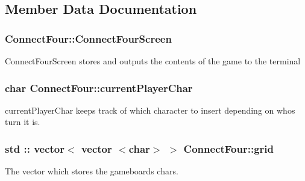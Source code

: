 \subsection{Member Data Documentation}
\hypertarget{classConnectFour_a7548207e4c83260233e8d3668ae3e7e2}{
\subsubsection[{Connect\-Four\-Screen}]{ Connect\-Four\-::\-Connect\-Four\-Screen\hspace{0.3cm}{\ttfamily [private]}}}\label{classConnectFour_a7548207e4c83260233e8d3668ae3e7e2}
Connect\-Four\-Screen stores and outputs the contents of the game to the terminal \hypertarget{classConnectFour_adc938d715dbe28efc1db3b4a1dc866cb}{
\subsubsection[{current\-Player\-Char}]{\setlength{\rightskip}{0pt plus 5cm}char Connect\-Four\-::current\-Player\-Char\hspace{0.3cm}{\ttfamily [private]}}}\label{classConnectFour_adc938d715dbe28efc1db3b4a1dc866cb}
current\-Player\-Char keeps track of which character to insert depending on whos turn it is. \hypertarget{classConnectFour_aa394189c6422c3901d18997202fff27e}{
\subsubsection[{grid}]{\setlength{\rightskip}{0pt plus 5cm}std \-:: vector$<$ vector $<$char$>$ $>$ Connect\-Four\-::grid\hspace{0.3cm}{\ttfamily [private]}}}\label{classConnectFour_aa394189c6422c3901d18997202fff27e}


The vector which stores the gameboards chars. 

